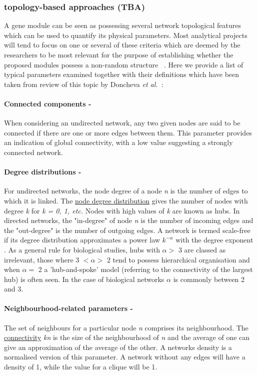 \subsubsection{topology-based approaches (TBA)}

A gene module can be seen as possessing several network topological features which can be used to quantify its physical parameters. Most analytical projects will tend to focus on one or several of these criteria which are deemed by the researchers to be most relevant for the purpose of establishing whether the proposed modules possess a non-random structure ~\autocite{Don2012}. Here we provide a list of typical parameters examined together with their definitions which have been taken from review of this topic by Doncheva \textit{et al.}~\autocite{Don2012}:

\paragraph{Connected components -} 
When considering an undirected network, any two given nodes are said to be connected if there are one or more edges between them. This parameter provides an indication of global connectivity, with a low value suggesting a strongly connected network.

\paragraph{Degree distributions -} 
For undirected networks, the node degree of a node \textit{n} is the number of edges to which it is linked. The \underline{node degree distribution} gives the number of nodes with degree \textit{k} for \textit{k = 0, 1, etc.} Nodes with high values of \textit{k} are known as hubs. In directed networks, the "in-degree" of node \textit{n} is the number of incoming edges and the "out-degree" is the number of outgoing edges. A network is termed scale-free if its degree distribution approximates a power law $k^{-\alpha}$ with the degree exponent \textalpha. As a general rule for biological studies, hubs with $\alpha >$ 3 are classed as irrelevant, those where 3 $< \alpha >$ 2 tend to possess hierarchical organisation and when $\alpha =$ 2 a 'hub-and-spoke' model (referring to the connectivity of the largest hub) is often seen. In the case of biological networks $\alpha$ is commonly between 2 and 3.

\paragraph{Neighbourhood-related parameters -} 
The set of neighbours for a particular node \textit{n} comprises its neighbourhood. The \underline{connectivity} \textit{kn} is the size of the neighbourhood of \textit{n} and the average of one can give an approximation of the average of the other. A networks density is a normalised version of this parameter. A network without any edges will have a density of 1, while the value for a clique will be 1.

